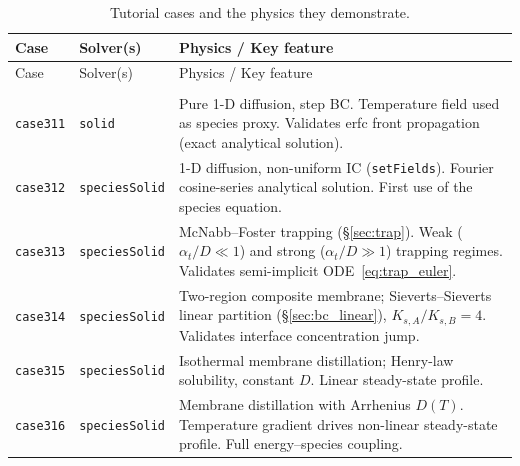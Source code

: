 \documentclass[11pt,a4paper]{article}
\newcommand{\caseref}[1]{\texttt{\color{casegreen}#1}}
\begin{document}
\small\setlength{\LTcapwidth}{\linewidth}
\begin{longtable}{%
  >{\raggedright\arraybackslash}p{1.8cm}
  >{\raggedright\arraybackslash}p{5.0cm}
  p{\dimexpr\linewidth-1.8cm-5.0cm-4\tabcolsep\relax}}
\caption{Tutorial cases and the physics they demonstrate.}
\label{tab:cases}\\
\toprule
Case & Solver(s) & Physics / Key feature \\
\midrule
\endfirsthead
\toprule
Case & Solver(s) & Physics / Key feature \\
\midrule
\endhead
\midrule\multicolumn{3}{r}{\small\itshape continued on next page\ldots}\\
\endfoot
\bottomrule
\endlastfoot

\caseref{case311} & \texttt{solid} &
  Pure 1-D diffusion, step BC.  Temperature field used as species proxy.
  Validates erfc front propagation (exact analytical solution). \\[2pt]

\caseref{case312} & \texttt{speciesSolid} &
  1-D diffusion, non-uniform IC (\texttt{setFields}).
  Fourier cosine-series analytical solution.  First use of the species equation. \\[2pt]

\caseref{case313} & \texttt{speciesSolid} &
  McNabb--Foster trapping (§\ref{sec:trap}).
  Weak ($\alpha_t/D \ll 1$) and strong ($\alpha_t/D \gg 1$) trapping regimes.
  Validates semi-implicit ODE~\eqref{eq:trap_euler}. \\[2pt]

\caseref{case314} & \texttt{speciesSolid} &
  Two-region composite membrane; Sieverts--Sieverts linear partition
  (§\ref{sec:bc_linear}), $K_{s,A}/K_{s,B} = 4$.
  Validates interface concentration jump. \\[2pt]

\caseref{case315} & \texttt{speciesSolid} &
  Isothermal membrane distillation; Henry-law solubility, constant $D$.
  Linear steady-state profile. \\[2pt]

\caseref{case316} & \texttt{speciesSolid} &
  Membrane distillation with Arrhenius $D(T)$.  Temperature gradient drives
  non-linear steady-state profile.  Full energy--species coupling. \\[2pt]


\end{longtable}
\end{document}
